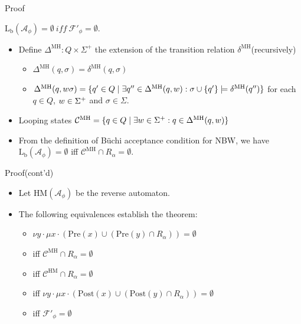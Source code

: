 \documentclass[12pt]{beamer}
\begin{document}
\begin{frame}{Proof}
	\begin{theorem}
		$\text{L}_{\text{b}}(\mathcal{A}_{\phi}) = \emptyset ~ iff ~ \mathcal{F}'_{\phi} = \emptyset$.
	\end{theorem}
	\begin{itemize}
		\item Define $\Delta^{\text{MH}} : Q \times \Sigma^{+}$ the extension of the transition relation $\delta^{\text{MH}}$(recursively)
		\begin{itemize}
			\item $\Delta^{\text{MH}}(q, \sigma) = \delta^{\text{MH}}(q, \sigma)$
			\item $\Delta^{\text{MH}}(q, \mathnormal{w}\sigma) = \{q' \in Q \mid \exists q'' \in \Delta^{\text{MH}}(q, \mathnormal{w}) : \sigma \cup \{q'\} \models \delta^{\text{MH}}(q'')\}$ for each $q \in Q$, $\mathnormal{w} \in \Sigma^{+}$ and $\sigma \in \Sigma$.
		\end{itemize}
		\item Looping states $\mathcal{C}^{\text{MH}} = \{q \in Q \mid \exists \mathnormal{w} \in \Sigma^{+} : q \in \Delta^{\text{MH}}(q,\mathnormal{w})\}$
		\item From the definition of Büchi acceptance condition for NBW, we have $\text{L}_{\text{b}}(\mathcal{A}_{\phi}) = \emptyset$ iff $\mathcal{C}^{\text{MH}} \cap R_{\alpha} = \emptyset$.
	\end{itemize}
\end{frame}

\begin{frame}{Proof(cont'd)}
	\begin{itemize}
		\item Let $\text{HM}(\mathcal{A}_{\phi})$ be the reverse automaton.
		\item The following equivalences establish the theorem:
		\begin{itemize}
				\item $\nu y \cdot \mu x \cdot (\text{Pre}(x) \cup (\text{Pre}(y) \cap R_{\alpha})) = \emptyset$
				\item iff $\mathcal{C}^{\text{MH}} \cap R_{\alpha} = \emptyset$
				\item iff $\mathcal{C}^{\text{HM}} \cap R_{\alpha} = \emptyset$
				\item iff $\nu y \cdot \mu x \cdot (\text{Post}(x) \cup (\text{Post}(y) \cap R_{\alpha})) = \emptyset$
				\item iff $\mathcal{F}'_{\phi} = \emptyset$
		\end{itemize}
	\end{itemize}
\end{frame}
\end{document}
